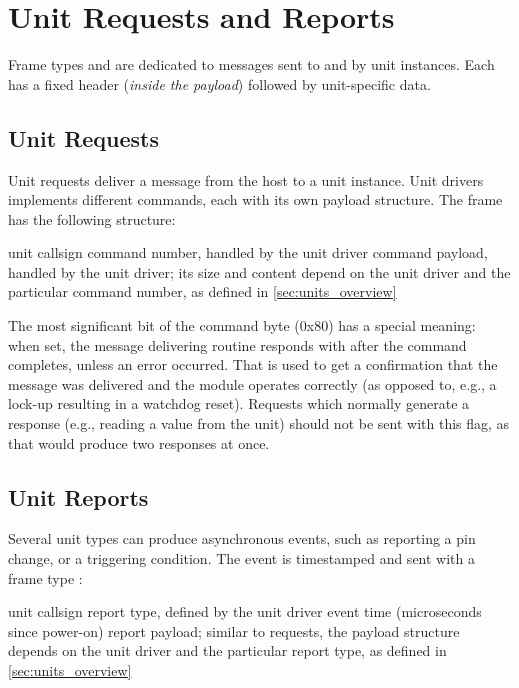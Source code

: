 \section{Unit Requests and Reports} \label{sec:unit_requests_reports}

Frame types \CmdUnitRequest and \CmdUnitReport are dedicated to messages sent to and by unit instances. Each has a fixed header (\textit{inside the payload}) followed by unit-specific data.

\subsection{Unit Requests}\label{sec:unit_requests_format}

Unit requests deliver a message from the host to a unit instance. Unit drivers implements different commands, each with its own payload structure. The frame \CmdUnitRequest has the following structure:

\begin{boxedpayload}
	 unit callsign
	 command number, handled by the unit driver
	 command payload, handled by the unit driver; its size and content depend on the unit driver and the particular command number, as defined in \cref{sec:units_overview}
\end{boxedpayload}

The most significant bit of the command byte (0x80) has a special meaning: when set, the message delivering routine responds with \CmdSuccess after the command completes, unless an error occurred. That is used to get a confirmation that the message was delivered and the module operates correctly (as opposed to, e.g., a lock-up resulting in a watchdog reset). Requests which normally generate a response (e.g., reading a value from the unit) should not be sent with this flag, as that would produce two responses at once.

\subsection{Unit Reports}\label{sec:unit_reports_format}

Several unit types can produce asynchronous events, such as reporting a pin change, or a triggering condition. The event is timestamped and sent with a frame type \CmdUnitReport:

\begin{boxedpayload}
	 unit callsign
	 report type, defined by the unit driver
	 event time (microseconds since power-on)
	 report payload; similar to requests, the payload structure depends on the unit driver and the particular report type, as defined in \cref{sec:units_overview}
\end{boxedpayload}

















